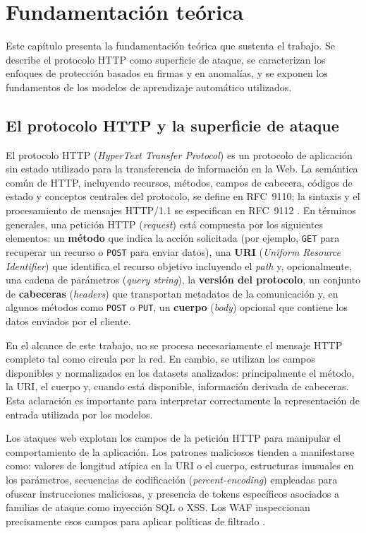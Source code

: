 \documentclass[12pt,oneside]{report}
\begin{document}
\chapter{Fundamentación teórica}

Este capítulo presenta la fundamentación teórica que sustenta el trabajo. Se describe el protocolo HTTP como superficie de ataque, se caracterizan los enfoques de protección basados en firmas y en anomalías, y se exponen los fundamentos de los modelos de aprendizaje automático utilizados.

\section{El protocolo HTTP y la superficie de ataque}

El protocolo HTTP (\textit{HyperText Transfer Protocol}) es un protocolo de aplicación sin estado utilizado para la transferencia de información en la Web. La semántica común de HTTP, incluyendo recursos, métodos, campos de cabecera, códigos de estado y conceptos centrales del protocolo, se define en RFC~9110; la sintaxis y el procesamiento de mensajes HTTP/1.1 se especifican en RFC~9112 \cite{rfc9110,rfc9112}. En términos generales, una petición HTTP (\textit{request}) está compuesta por los siguientes elementos: un \textbf{método} que indica la acción solicitada (por ejemplo, \texttt{GET} para recuperar un recurso o \texttt{POST} para enviar datos), una \textbf{URI} (\textit{Uniform Resource Identifier}) que identifica el recurso objetivo incluyendo el \textit{path} y, opcionalmente, una cadena de parámetros (\textit{query string}), la \textbf{versión del protocolo}, un conjunto de \textbf{cabeceras} (\textit{headers}) que transportan metadatos de la comunicación y, en algunos métodos como \texttt{POST} o \texttt{PUT}, un \textbf{cuerpo} (\textit{body}) opcional que contiene los datos enviados por el cliente.

En el alcance de este trabajo, no se procesa necesariamente el mensaje HTTP completo tal como circula por la red. En cambio, se utilizan los campos disponibles y normalizados en los datasets analizados: principalmente el método, la URI, el cuerpo y, cuando está disponible, información derivada de cabeceras. Esta aclaración es importante para interpretar correctamente la representación de entrada utilizada por los modelos.

Los ataques web explotan los campos de la petición HTTP para manipular el comportamiento de la aplicación. Los patrones maliciosos tienden a manifestarse como: valores de longitud atípica en la URI o el cuerpo, estructuras inusuales en los parámetros, secuencias de codificación (\textit{percent-encoding}) empleadas para ofuscar instrucciones maliciosas, y presencia de tokens específicos asociados a familias de ataque como inyección SQL o XSS. Los WAF inspeccionan precisamente esos campos para aplicar políticas de filtrado \cite{owasp_waf,modsecurity_site}.
\end{document}
